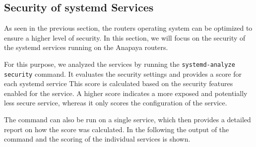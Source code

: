 \subsection{Security of systemd Services}
\label{sec:systemd-services}
As seen in the previous section, the routers operating system can be optimized to ensure a higher level of security.
In this section, we will focus on the security of the systemd services running on the Anapaya routers.

For this purpose, we analyzed the services by running the \texttt{systemd-analyze security} command.
It evaluates the security settings and provides a score for each systemd service
This score is calculated based on the security features enabled for the service.
A higher score indicates a more exposed and potentially less secure service, whereas it only scores the configuration of the service.

The command can also be run on a single service, which then provides a detailed report on how the score was calculated.
In the following the output of the command and the scoring of the individual services is shown.



